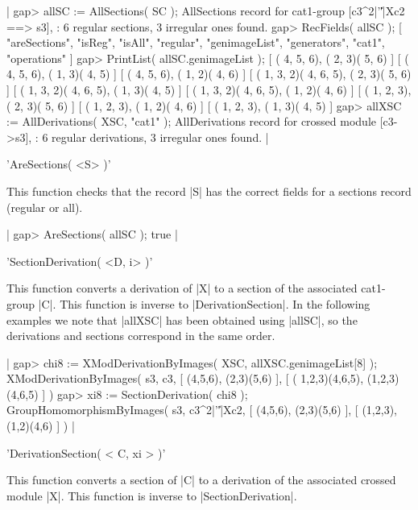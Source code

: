 {|    gap> allSC := AllSections( SC );
    AllSections record for cat1-group [c3^2|'\|'|Xc2 ==> s3],
    : 6 regular sections,  3 irregular ones found. 
    gap> RecFields( allSC );
    [ "areSections", "isReg", "isAll", "regular", "genimageList",
      "generators", "cat1", "operations" ]
    gap> PrintList( allSC.genimageList );
    [ ( 4, 5, 6), ( 2, 3)( 5, 6) ]
    [ ( 4, 5, 6), ( 1, 3)( 4, 5) ]
    [ ( 4, 5, 6), ( 1, 2)( 4, 6) ]
    [ ( 1, 3, 2)( 4, 6, 5), ( 2, 3)( 5, 6) ]
    [ ( 1, 3, 2)( 4, 6, 5), ( 1, 3)( 4, 5) ]
    [ ( 1, 3, 2)( 4, 6, 5), ( 1, 2)( 4, 6) ]
    [ ( 1, 2, 3), ( 2, 3)( 5, 6) ]
    [ ( 1, 2, 3), ( 1, 2)( 4, 6) ]
    [ ( 1, 2, 3), ( 1, 3)( 4, 5) ] 
    gap> allXSC := AllDerivations( XSC, "cat1" );
    AllDerivations record for crossed module [c3->s3],
    : 6 regular derivations,  3 irregular ones found.   |

%

'AreSections( <S> )'

This function checks that the record |S| has the correct fields for a
sections record (regular or all).

|    gap> AreSections( allSC );
    true |

%

'SectionDerivation( <D, i> )'

This function converts a derivation of |X| to a section of the
associated cat1-group |C|. This function is inverse to |DerivationSection|.
In the following examples we note that |allXSC| has been obtained using
|allSC|, so the derivations and sections correspond in the same order.

|    gap> chi8 := XModDerivationByImages( XSC, allXSC.genimageList[8] );
    XModDerivationByImages( s3, c3, [ (4,5,6), (2,3)(5,6) ], 
       [ ( 1,2,3)(4,6,5), (1,2,3)(4,6,5) ] )
    gap> xi8 := SectionDerivation( chi8 );
    GroupHomomorphismByImages( s3, c3^2|'\|'|Xc2,
        [ (4,5,6), (2,3)(5,6) ], [ (1,2,3), (1,2)(4,6) ] )  |

%

'DerivationSection( < C, xi > )'

This function converts a section of |C| to a derivation of the associated 
crossed module |X|.  This function is inverse to |SectionDerivation|.

}
